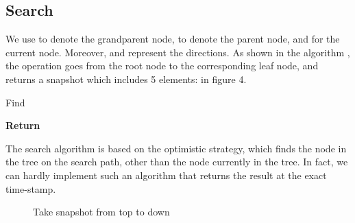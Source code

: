 \documentclass{article}
\begin{document}
\subsection{Search}
We use  to denote the grandparent node,  to denote the parent node, and  for the current node. Moreover,  and  represent the directions. As shown in the algorithm , the operation goes from the root node to the corresponding leaf node, and returns a snapshot which includes 5 elements:  in figure 4. 
\begin{algorithm}
\caption{Find}
\begin{algorithmic}[1]
    \State 
    \State 
    \While {}
        \State 
        \If {}
            \State 
        \Else
            \State 
        \EndIf
    \EndWhile
    \State \textbf{Return} 
\end{algorithmic}
\end{algorithm}
The search algorithm is based on the optimistic strategy, which finds the node  in the tree on the search path, other than the node  currently in the tree. In fact, we can hardly implement such an algorithm that returns the result at the exact time-stamp. 
\begin{figure}[htbp]
\centering
{}
\caption{Take snapshot from top to down}
\label{fig:my_label2}
\end{figure}
\end{document}
